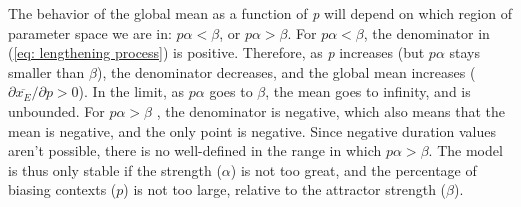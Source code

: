 The behavior of the global mean as a function of \emph{p} will depend
on which region of parameter space we are in: $p\alpha<\beta$, or
$p\alpha>\beta$. For $p\alpha<\beta$, the denominator in (\ref{eq: lengthening process})
is positive. Therefore, as \emph{p} increases (but $p\alpha$ stays
smaller than $\beta$), the denominator decreases, and the global
mean increases (${\partial\overline{x_{E}}}/{\partial p}>0$).
In the limit, as $p\alpha$ goes to $\beta$, the  mean
goes to infinity, and  is unbounded. For $p\alpha>\beta$
, the denominator is negative, which also means that the mean is negative,
and the only  point is negative. Since negative duration
values aren't possible, there is no well-defined  in the
range in which $p\alpha>\beta$. The  model is thus
only stable if the  strength ($\alpha$) is not too great,
and the percentage of biasing contexts ($p$) is not too large, relative
to the attractor strength ($\beta$).

